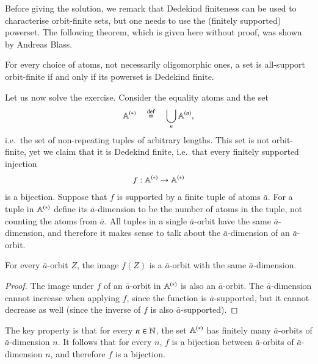 {	Before giving the solution, we remark that Dedekind finiteness can be used to characterise orbit-finite sets, but one needs to use the (finitely supported) powerset. The following theorem, which is given here without proof, was shown by Andreas Blass.
\begin{theorem}\label{thm:}
	For every choice of atoms, not necessarily oligomorphic ones, a set is all-support orbit-finite if and only if its powerset is Dedekind finite.
\end{theorem}

Let us now solve the exercise.
Consider the equality atoms and the set 
	\begin{align*}
		\mathbb A^{(*)} \quad \stackrel {\mathrm{def}} = \quad \bigcup_n \mathbb A^{(n)},
	\end{align*}
	i.e.~the set of non-repeating tuples of arbitrary lengths. This set is not orbit-finite, yet we claim that it is Dedekind finite, i.e.~that every finitely supported injection
	\begin{align*}
		f : \mathbb A^{(*)} \to \mathbb A^{(*)}
	\end{align*}
	is a bijection. Suppose that $f$ is supported by a finite tuple of atoms $\bar a$. 	
For a tuple in $\mathbb A^{(*)}$ define its $\bar a$-dimension to be the number of atoms in the tuple, not counting the atoms from $\bar a$. 
	 All tuples in a single $\bar a$-orbit have the same $\bar a$-dimension, and therefore it makes sense to talk about the $\bar a$-dimension of an $\bar a$-orbit.
\begin{claim}
	For every $\bar a$-orbit $Z$, the image $f(Z)$ is a $\bar a$-orbit with the same $\bar a$-dimension.
\end{claim}
\begin{proof}
The image under $f$ of an $\bar a$-orbit in $\mathbb A^{(*)}$ is also an $\bar a$-orbit.
	The $\bar a$-dimension cannot increase when applying $f$, since the function is $\bar a$-supported, but it cannot decrease as well (since the inverse of $f$ is also $\bar a$-supported). 
\end{proof}

	 The key property is that for every $n\in {\mathbb N}$, the set $\mathbb A^{(*)}$ has finitely many $\bar a$-orbits of $\bar a$-dimension $n$. It follows that for every $n$, $f$ is a bijection between $\bar a$-orbits of $\bar a$-dimension $n$, and therefore $f$ is a bijection.}


